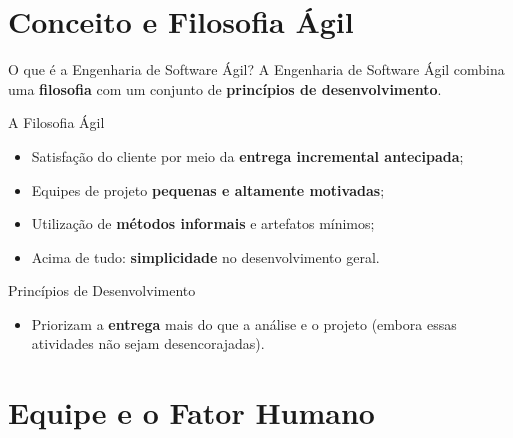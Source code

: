 \documentclass[aspectratio=169, 9pt]{beamer}
\begin{document}
\section{Conceito e Filosofia Ágil}

\begin{frame}{O que é a Engenharia de Software Ágil?}
  A Engenharia de Software Ágil combina uma \textbf{filosofia} com um conjunto de \textbf{princípios de desenvolvimento}.

  \vspace{0.3cm}
  \begin{block}{A Filosofia Ágil}
    \begin{itemize}
      \item Satisfação do cliente por meio da \textbf{entrega incremental antecipada};
      \item Equipes de projeto \textbf{pequenas e altamente motivadas};
      \item Utilização de \textbf{métodos informais} e artefatos mínimos;
      \item Acima de tudo: \textbf{simplicidade} no desenvolvimento geral.
    \end{itemize}
  \end{block}

  \vspace{0.2cm}
  \begin{block}{Princípios de Desenvolvimento}
    \begin{itemize}
      \item Priorizam a \textbf{entrega} mais do que a análise e o projeto (embora essas atividades não sejam desencorajadas).
    \end{itemize}
  \end{block}
\end{frame}


\section{Equipe e o Fator Humano}
\end{document}
